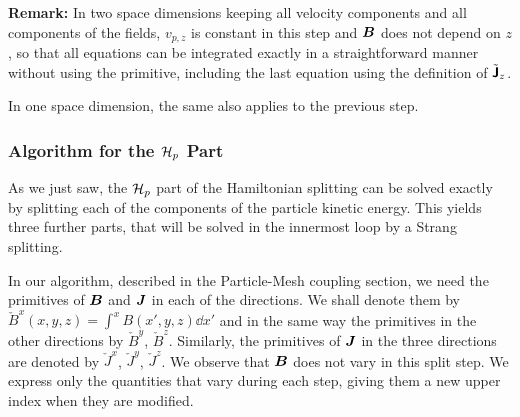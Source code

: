 \documentclass[11pt]{article}
\begin{document}
\textbf{Remark:} In two space dimensions keeping all velocity components and all components of the fields, $v_{p,z}$ is constant in this step and ${\boldsymbol B}$ does not depend on $z$, so that
all equations can be integrated exactly in a straightforward manner without using the primitive,
including the last equation using the definition of $\tilde{{\boldsymbol {\rm \mathsf{J}}}}_z$.

In one space dimension, the same also applies to the previous step.

\subsubsection{Algorithm for the $\mathcal{H}_p$ Part}
\label{sec:splitting_vlasovmaxwell_algo}

As we just saw, the  $\mathcal{H}_p$ part of the Hamiltonian splitting can be solved exactly by splitting each of the components of the particle kinetic energy. This yields three further parts, that will be solved in the innermost loop by a Strang splitting.

In our algorithm, described in the Particle-Mesh coupling section, we need the primitives
of ${\boldsymbol B}$  and ${\boldsymbol J}$ in each of the directions. We shall denote them by
$\check{B}^x(x,y,z) = \int^x B(x',y,z) \dd x'$ and in the same way the primitives in the other directions  by $\check{B}^y$, $\check{B}^z$. Similarly, the primitives of ${\boldsymbol J}$ in the three directions are denoted by $\check{J}^x$, $\check{J}^y$, $\check{J}^z$.
We observe that ${\boldsymbol B}$ does not vary in this split step. We express only the quantities that vary during each step, giving them a new upper index when they are modified.
\end{document}

